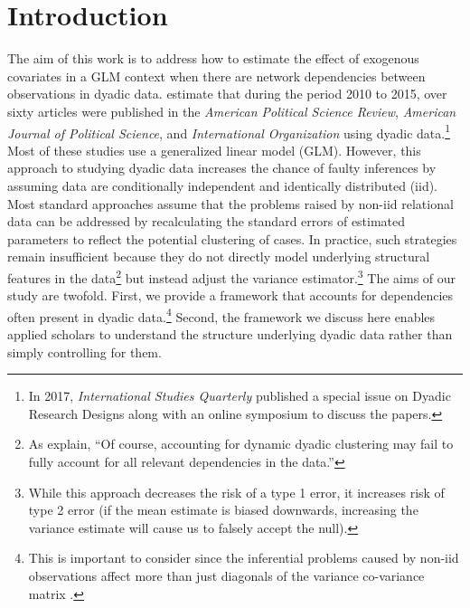\section{\textbf{Introduction}}

The aim of this work is to address how to estimate the effect of exogenous covariates in a GLM context when there are network dependencies between observations in dyadic data. \citet{aronow:etal:2015} estimate that during the period 2010 to 2015, over sixty articles were published in the \textit{American Political Science Review}, \textit{American Journal of Political Science}, and \textit{International Organization} using dyadic data.\footnote{In 2017, \textit{International Studies Quarterly} published a special issue on Dyadic Research Designs along with an online symposium to discuss the papers.} Most of these studies use a generalized linear model (GLM).  However, this approach to studying dyadic data increases the chance of faulty inferences by assuming data are conditionally independent and identically distributed (iid). Most standard approaches assume that the problems raised by non-iid relational data can be addressed by recalculating the standard errors of estimated parameters to reflect the potential clustering of cases. In practice, such strategies remain insufficient because they do not directly model underlying structural features in the data\footnote{As \citet[p.15]{aronow:etal:2015} explain, ``Of course, accounting for dynamic dyadic clustering may fail to fully account for all relevant dependencies in the data.''} but instead adjust the variance estimator.\footnote{While this approach decreases the risk of a type 1 error, it increases risk of type 2 error (if the mean estimate is biased downwards, increasing the variance estimate will cause us to falsely accept the null).} The aims of our study are twofold. First, we provide a framework that accounts for dependencies often present in dyadic data.\footnote{This is important to consider since the inferential problems caused by non-iid observations affect more than just diagonals of the variance co-variance matrix \citep{beck:2012,franzese:hays:2007,king:roberts:2014}.} Second, the framework we discuss here enables applied scholars to understand the structure underlying dyadic data rather than simply controlling for them.

